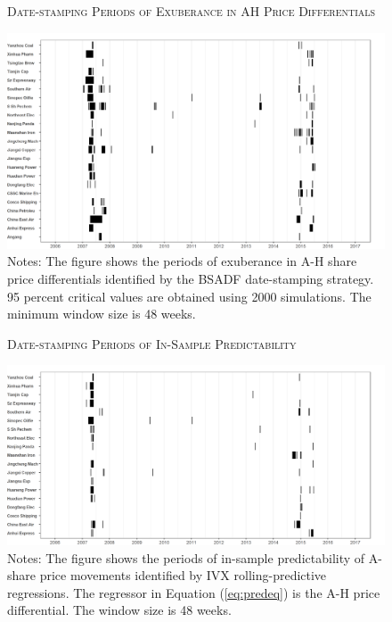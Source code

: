 \documentclass[11pt]{article}
\begin{document}
\begin{figure}[!t]
     \caption{\textsc{Date-stamping Periods of Exuberance in AH Price Differentials}}
    \centering
    \includegraphics[width = \textwidth]{concordance-AH.png}
    \caption*{\scriptsize Notes: The figure shows the periods of exuberance in A-H share price differentials identified by the BSADF date-stamping strategy. 95 percent critical values are obtained using 2000 simulations. The minimum window size is 48 weeks.}
    \label{fig:datestamp-pairs}
\end{figure}

\begin{figure}[!t]
    \caption{ \textsc{Date-stamping Periods of In-Sample Predictability}}
    \centering
    \includegraphics[scale=0.60]{pred-AH.png}
    \caption*{\scriptsize Notes: The figure shows the periods of in-sample predictability of A-share price movements identified by IVX rolling-predictive regressions. The regressor in Equation (\ref{eq:predeq}) is the A-H price differential. The window size is 48 weeks.} 
    \label{fig:pred-AH}
\end{figure}
\end{document}
